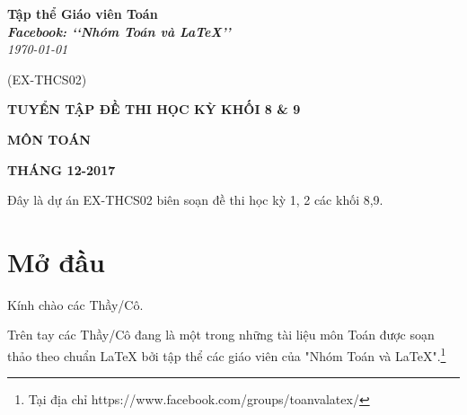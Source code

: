 \documentclass[12pt,a4paper,oneside]{book}
\renewcommand{\baselinestretch}{1.4}
\begin{document}
\providecommand*{\dx}{\ensuremath{\mathrm{\,d}}x}
\providecommand*{\unit}[1]{\ensuremath{\mathrm{\,#1}}}

\begin{titlepage}
\begin{flushright}
\fontsize{17}{0}\selectfont
\textbf{Tập thể Giáo viên Toán}\\
\textbf{\textit{Facebook: \lq\lq Nhóm Toán và LaTeX\rq\rq}}\\
\textit{\color{red}\today}

(EX-THCS02)
\end{flushright}

\vspace{4cm}

\begin{flushright}

\vspace{1cm}

 \textbf{\fontsize{30}{0}\selectfont T\fontsize{20}{0}\selectfont UYỂN TẬP ĐỀ THI HỌC KỲ KHỐI 8 \& 9}
 
 \vspace{1cm}
 
 \textbf{\fontsize{35}{0}\selectfont MÔN TOÁN}
 
\end{flushright}


\vfill{
\begin{flushright}
\fontsize{17}{0}\textbf{THÁNG 12-2017}
\end{flushright}
}
\end{titlepage}
\pagestyle{empty}
\renewcommand{\headrulewidth}{0.4pt}

{\renewcommand{\baselinestretch}{1.3}
	\newpage
	Đây là dự án EX-THCS02 biên soạn đề thi học kỳ 1, 2 các khối 8,9.
	\newpage
\tableofcontents
}

\pagestyle{fancy}
\lhead{\empty}
\rhead{\empty}
\lfoot{\currfilename}

\chapter*{Mở đầu}
Kính chào các Thầy/Cô.

\vspace{0.6cm}

\noindent Trên tay các Thầy/Cô đang là một trong những tài liệu môn Toán được soạn thảo theo chuẩn \LaTeX{} bởi tập thể các giáo viên của "Nhóm Toán và LaTeX".\footnote{Tại địa chỉ https://www.facebook.com/groups/toanvalatex/}
\end{document}
